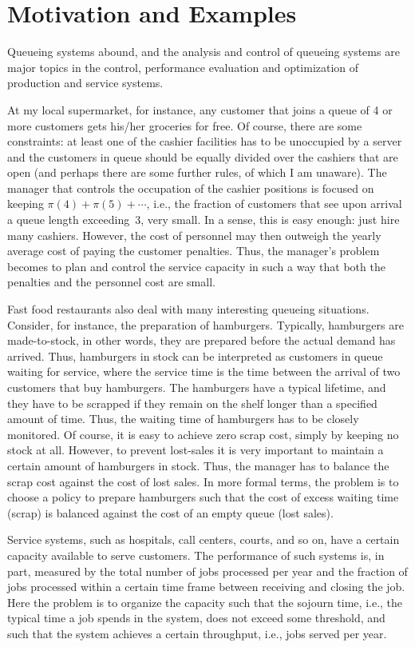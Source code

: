 \section*{Motivation and Examples}
Queueing systems abound, and the analysis and control of queueing systems are major topics in the control, performance evaluation and optimization of production and service systems.


At my local supermarket, for instance, any customer that joins a queue of 4 or more customers gets his/her groceries for free.
Of course, there are some constraints: at least one of the cashier facilities has to be unoccupied by a server and the customers in queue should be equally divided over the cashiers that are open (and perhaps there are some further rules, of which I am unaware).
The manager that controls the occupation of the cashier positions is focused on keeping $\pi(4)+\pi(5)+\cdots$, i.e., the fraction of customers that see upon arrival a queue length exceeding~3, very small.
In a sense, this is easy enough: just hire many cashiers.
However, the cost of personnel may then outweigh the yearly average cost of paying the customer penalties.
Thus, the manager's problem becomes to plan and control the service capacity in such a way that both the penalties and the personnel cost are small.

Fast food restaurants also deal with many interesting queueing situations.
Consider, for instance, the preparation of hamburgers.
Typically, hamburgers are made-to-stock, in other words, they are prepared before the actual demand has arrived.
Thus, hamburgers in stock can be interpreted as customers in queue waiting for service, where the service time is the time between the arrival of two customers that buy hamburgers.
The hamburgers have a typical lifetime, and they have to be scrapped if they remain on the shelf longer than a specified amount of time.
Thus, the waiting time of hamburgers has to be closely monitored.
Of course, it is easy to achieve zero scrap cost, simply by keeping no stock at all.
However, to prevent lost-sales it is very important to maintain a certain amount of hamburgers in stock.
Thus, the manager has to balance the scrap cost against the cost of lost sales.
In more formal terms, the problem is to choose a policy to prepare hamburgers such that the cost of excess waiting time (scrap) is balanced against the cost of an empty queue (lost sales).

Service systems, such as hospitals, call centers, courts, and so on,
have a certain capacity available to serve customers. The performance
of such systems is, in part, measured by the total number of jobs
processed per year and the fraction of jobs processed within a certain
time frame between receiving and closing the job. Here the problem is to
organize the capacity such that the sojourn time, i.e., the typical
time a job spends in the system, does not exceed some threshold, and
such that the system achieves a certain throughput, i.e., jobs served
per year. 

